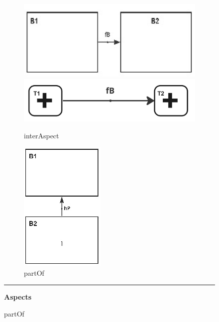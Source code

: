 \documentclass[../main.tex]{subfiles}
\begin{document}
\begin{figure}
  \begin{subfigure}[b]{0.3\textwidth}\centering
    \includegraphics[width=1\textwidth]{img/IMFmanual-img017.jpg}
    \includegraphics[width=.5\textwidth]{img/IMFmanual-img018.jpg}
    \caption{interAspect}
  \end{subfigure}
  \hspace{2cm}
  \begin{subfigure}[b]{0.3\textwidth}\centering
    \includegraphics[width=.5\textwidth]{img/IMFmanual-img019.jpg}
    \caption{partOf}
  \end{subfigure}


  \par\noindent\rule{.9\textwidth}{0.4pt}\vspace{3ex}
  
  \textbf{Aspects}\\[2ex]


\end{figure}
\end{document}
